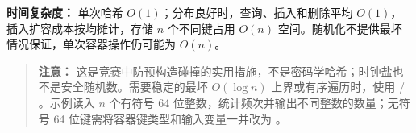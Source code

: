 \textbf{时间复杂度：} 单次哈希 $O(1)$；分布良好时，查询、插入和删除平均 $O(1)$，插入扩容成本按均摊计，存储 $n$ 个不同键占用 $O(n)$ 空间。随机化不提供最坏情况保证，单次容器操作仍可能为 $O(n)$。

\begin{quote}
  \textbf{注意：} 这是竞赛中防预构造碰撞的实用措施，不是密码学哈希；时钟盐也不是安全随机数。需要稳定的最坏 $O(\log n)$ 上界或有序遍历时，使用  / 。示例读入 $n$ 个有符号 64 位整数，统计频次并输出不同整数的数量；无符号 64 位键需将容器键类型和输入变量一并改为 。
\end{quote}


